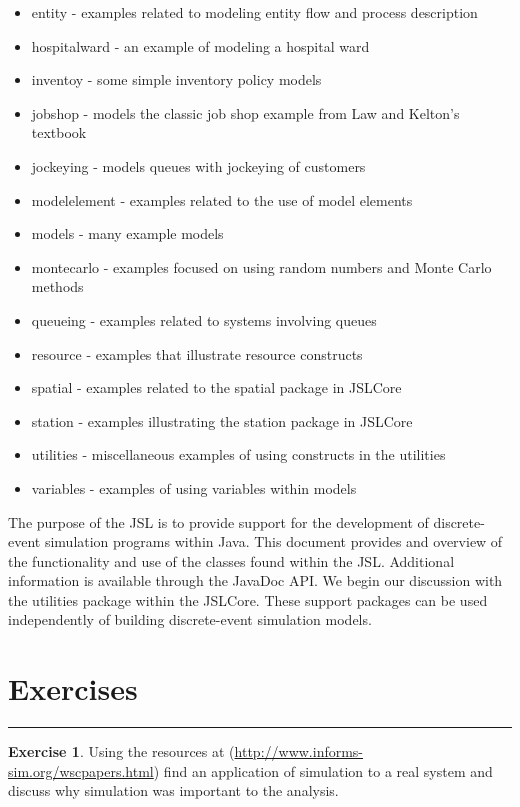 \documentclass[
]{book}
\providecommand{\tightlist}{%
  \setlength{\itemsep}{0pt}\setlength{\parskip}{0pt}}
\theoremstyle{definition}
\theoremstyle{definition}
\theoremstyle{definition}
\newtheorem{exercise}{Exercise}[chapter]
\theoremstyle{definition}
\theoremstyle{remark}
\begin{document}
\begin{itemize}
\tightlist
\item
  entity - examples related to modeling entity flow and process description
\item
  hospitalward - an example of modeling a hospital ward
\item
  inventoy - some simple inventory policy models
\item
  jobshop - models the classic job shop example from Law and Kelton's textbook
\item
  jockeying - models queues with jockeying of customers
\item
  modelelement - examples related to the use of model elements
\item
  models - many example models
\item
  montecarlo - examples focused on using random numbers and Monte Carlo methods
\item
  queueing - examples related to systems involving queues
\item
  resource - examples that illustrate resource constructs
\item
  spatial - examples related to the spatial package in JSLCore
\item
  station - examples illustrating the station package in JSLCore
\item
  utilities - miscellaneous examples of using constructs in the utilities
\item
  variables - examples of using variables within models
\end{itemize}

The purpose of the JSL is to provide support for the development of discrete-event simulation programs within Java. This document provides and overview of the functionality and use of the classes found within the JSL. Additional information is available through the JavaDoc API. We begin our discussion with the utilities package within the JSLCore. These support packages can be used independently of building discrete-event simulation models.

\hypertarget{exercises}{%
\section{Exercises}\label{exercises}}

\begin{center}\rule{0.5\linewidth}{0.5pt}\end{center}

\begin{exercise}
\protect\hypertarget{exr:ch1P1}{}{\label{exr:ch1P1} }Using the resources at
(\url{http://www.informs-sim.org/wscpapers.html}) find an application of
simulation to a real system and discuss why simulation was important to
the analysis.
\end{exercise}
\end{document}
